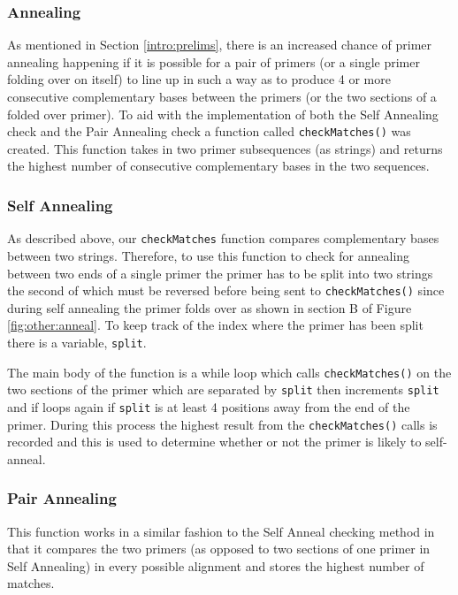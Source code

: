 \subsubsection{Annealing}

As mentioned in Section \ref{intro:prelims}, there is an increased
chance of primer annealing happening if it is possible for a pair of
primers (or a single primer folding over on itself) to line up in such a
way as to produce 4 or more consecutive complementary bases between the
primers (or the two sections of a folded over primer). To aid with the
implementation of both the Self Annealing check and the Pair Annealing
check a function called \texttt{checkMatches()} was created. This function
takes in two primer subsequences (as strings) and returns the highest 
number of consecutive complementary bases in the two sequences.

\subsubsection{Self Annealing}

As described above, our \texttt{checkMatches} function compares
complementary bases between two strings. Therefore, to use this function
to check for annealing between two ends of a single primer the primer
has to be split into two strings the second of which must be reversed
before being sent to \texttt{checkMatches()} since during self annealing
the primer folds over as shown in section B of Figure 
\ref{fig:other:anneal}. To keep track of the index where the primer has
been split there is a variable, \texttt{split}.

The main body of the function is a while loop which calls
\texttt{checkMatches()} on the two sections of the primer which are
separated by \texttt{split} then increments \texttt{split} and if loops
again if \texttt{split} is at least 4 positions away from the end of the
primer. During this process the highest result from the
\texttt{checkMatches()} calls is recorded and this is used to determine
whether or not the primer is likely to self-anneal.

\subsubsection{Pair Annealing}

This function works in a similar fashion to the Self Anneal checking
method in that it compares the two primers (as opposed to two sections
of one primer in Self Annealing) in every possible alignment and stores
the highest number of matches.

